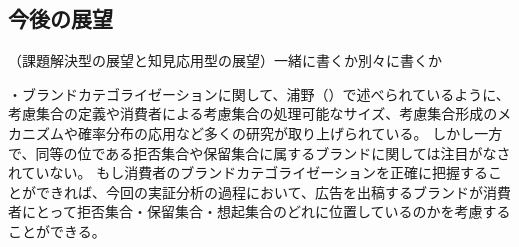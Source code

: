 \documentclass[11pt]{jsarticle}
\begin{document}
\subsection{今後の展望}
\label{sec:suggestion}
（課題解決型の展望と知見応用型の展望）一緒に書くか別々に書くか

・ブランドカテゴライゼーションに関して、浦野（）で述べられているように、考慮集合の定義や消費者による考慮集合の処理可能なサイズ、考慮集合形成のメカニズムや確率分布の応用など多くの研究が取り上げられている。
しかし一方で、同等の位である拒否集合や保留集合に属するブランドに関しては注目がなされていない。
もし消費者のブランドカテゴライゼーションを正確に把握することができれば、今回の実証分析の過程において、広告を出稿するブランドが消費者にとって拒否集合・保留集合・想起集合のどれに位置しているのかを考慮することができる。

\nocite{*}

\newpage
\appendix %


\newpage



\end{document}
